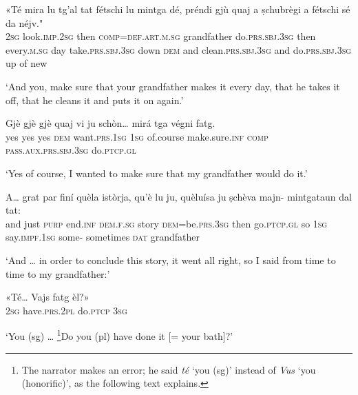 \begin{linenumbers}
\gll  «Té mira lu tg’al tat fétschi lu mintga dé, préndi gjù quaj a ṣchubrègi a fétschi sé da néjv."  \\
 \textsc{2sg} look.\textsc{imp.2sg} then \textsc{comp=def.art.m.sg} grandfather  do.\textsc{prs.sbj.3sg} then every.\textsc{m.sg} day take.\textsc{prs.sbj.3sg} down \textsc{dem} and clean.\textsc{prs.sbj.3sg} and do.\textsc{prs.sbj.3sg} up of new   \\
\end{linenumbers}
\medskip
\glt `And you, make sure that your grandfather makes it every day, that he takes it off, that he cleans it and puts it on again.'
\medskip

\begin{linenumbers}
\gll  Gjè gjè gjè quaj vi ju schòn… mirá tga végni fatg.  \\
yes yes yes  \textsc{dem} want.\textsc{prs.1sg} \textsc{1sg} of.course  make.sure.\textsc{inf} \textsc{comp} \textsc{pass.aux.prs.sbj.3sg} do.\textsc{ptcp.gl}   \\
\end{linenumbers}
\medskip
\glt `Yes of course, I wanted to make sure that my grandfather would do it.'
\medskip

\begin{linenumbers}
\gll  A… grat par finí quèla istòrja, qu’è lu ju, quèluísa ju ṣchèva majn- mintgataun dal tat:  \\
and just  \textsc{purp} end.\textsc{inf} \textsc{dem.f.sg} story \textsc{dem=}be.\textsc{prs.3sg} then  go.\textsc{ptcp.gl} so \textsc{1sg} say.\textsc{impf.1sg} some- sometimes \textsc{dat} grandfather    \\
\end{linenumbers}
\medskip
\glt `And … in order to conclude this story, it went all right, so I said from time to time to my grandfather:'
\medskip

\begin{linenumbers}
\gll «Té… Vajs fatg èl?»   \\
 \textsc{2sg} have.\textsc{prs.2pl} do.\textsc{ptcp} \textsc{3sg}   \\
\end{linenumbers}
\medskip
\glt `You (sg) … \footnote{The narrator makes an error; he said \textit{té} ‘you (sg)’ instead of \textit{Vus} ‘you (honorific)’, as the following text explains.}Do you (pl) have done it [= your bath]?'
\medskip

